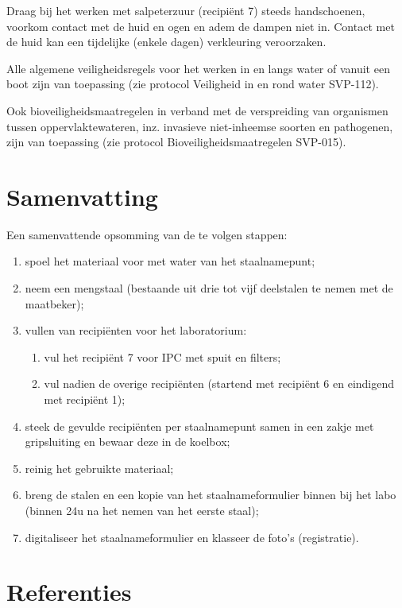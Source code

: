 \documentclass[
]{scrreprt}
\begin{document}
Draag bij het werken met salpeterzuur (recipiënt 7) steeds handschoenen, voorkom contact met de huid en ogen en adem de dampen niet in. Contact met de huid kan een tijdelijke (enkele dagen) verkleuring veroorzaken.

Alle algemene veiligheidsregels voor het werken in en langs water of vanuit een boot zijn van toepassing (zie protocol Veiligheid in en rond water SVP-112).

Ook bioveiligheidsmaatregelen in verband met de verspreiding van organismen tussen oppervlaktewateren, inz. invasieve niet-inheemse soorten en pathogenen, zijn van toepassing (zie protocol Bioveiligheidsmaatregelen SVP-015).

\chapter{Samenvatting}\label{samenvatting}

Een samenvattende opsomming van de te volgen stappen:

\begin{enumerate}
\def\labelenumi{\arabic{enumi}.}
\item
  spoel het materiaal voor met water van het staalnamepunt;
\item
  neem een mengstaal (bestaande uit drie tot vijf deelstalen te nemen met de maatbeker);
\item
  vullen van recipiënten voor het laboratorium:

  \begin{enumerate}
  \def\labelenumii{\arabic{enumii}.}
  \item
    vul het recipiënt 7 voor IPC met spuit en filters;
  \item
    vul nadien de overige recipiënten (startend met recipiënt 6 en eindigend met recipiënt 1);
  \end{enumerate}
\item
  steek de gevulde recipiënten per staalnamepunt samen in een zakje met gripsluiting en bewaar deze in de koelbox;
\item
  reinig het gebruikte materiaal;
\item
  breng de stalen en een kopie van het staalnameformulier binnen bij het labo (binnen 24u na het nemen van het eerste staal);
\item
  digitaliseer het staalnameformulier en klasseer de foto's (registratie).
\end{enumerate}

\chapter{Referenties}\label{referenties}
\end{document}
